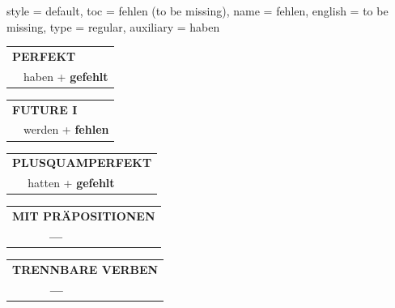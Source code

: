 \begin{verbentry}{
  style = {default},
  toc = {fehlen (to be missing)},
  name = {fehlen},
  english = {to be missing},
  type = {regular},
  auxiliary = {haben}
}
    \vspace{10pt}

 \begin{tabular}{rl}
     \multicolumn{2}{l}{\textbf{PERFEKT}}\\
    &haben + \textbf{gefehlt}\\
  \end{tabular}
\hfill
   \begin{tabular}{rl}
   
    \multicolumn{2}{l}{\textbf{FUTURE I} }\\
   & werden + \textbf{fehlen}\\
 
  \end{tabular}
\hfill
   \begin{tabular}{rl}
      \multicolumn{2}{l}{\textbf{PLUSQUAMPERFEKT}}\\
    &hatten + \textbf{gefehlt}\\
  \end{tabular}
  
  \vspace{10pt}

\begin{tabular}{lll}
\multicolumn{3}{l}{\textbf{MIT PRÄPOSITIONEN}}\\
& \textbf{---} & \\
\end{tabular}
\hfill
\begin{tabular}{lll}
\multicolumn{3}{l}{\textbf{TRENNBARE VERBEN}}\\
& \textbf{---} & \\
\end{tabular}

  \vspace{-5pt}
\end{verbentry}

